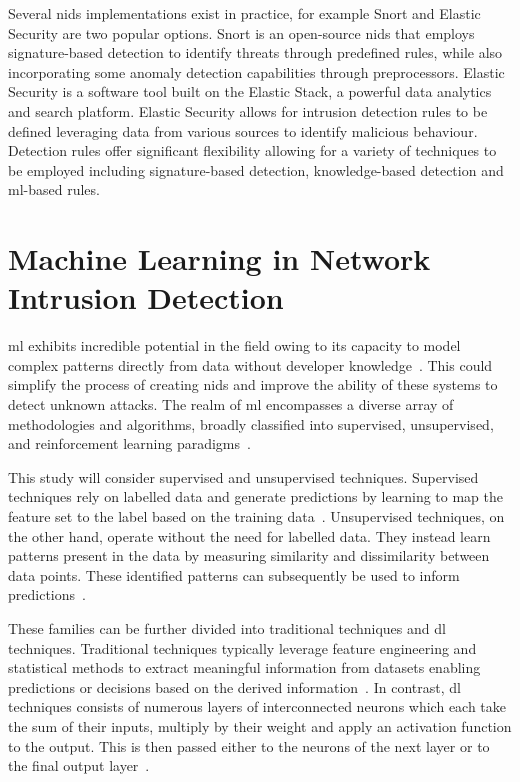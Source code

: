 Several \gls{nids} implementations exist in practice, for example Snort and
Elastic Security are two popular options. Snort is an open-source \gls{nids}
that employs signature-based detection to identify threats through predefined
rules, while also incorporating some anomaly detection capabilities through
preprocessors. Elastic Security is a software tool built on the Elastic Stack,
a powerful data analytics and search platform. Elastic Security allows for
intrusion detection rules to be defined leveraging data from various sources to
identify malicious behaviour. Detection rules offer significant flexibility
allowing for a variety of techniques to be employed including signature-based
detection, knowledge-based detection and \gls{ml}-based rules.

\section{Machine Learning in Network Intrusion
  Detection}%
\label{sec:ml_nids}

\gls{ml} exhibits incredible potential in the field owing to its capacity to
model complex patterns directly from data without developer
knowledge~\cite{ml}.
This could simplify the process of creating \gls{nids} and improve the ability
of these systems to detect unknown attacks. The realm of \gls{ml} encompasses a
diverse array of methodologies and algorithms, broadly classified into
supervised, unsupervised, and reinforcement learning
paradigms~\cite{ml_taxonomy}.

This study will consider supervised and unsupervised techniques. Supervised
techniques rely on labelled data and generate predictions by learning to map
the feature set to the label based on the training data~\cite{supervised_ml,
    ml_taxonomy}. Unsupervised techniques, on the other hand, operate without the
need for labelled data. They instead learn patterns present in the data by
measuring similarity and dissimilarity between data points. These identified
patterns can subsequently be used to inform predictions~\cite{unsupervised_ml,
    ml_taxonomy}.

These families can be further divided into traditional techniques and \gls{dl}
techniques. Traditional techniques typically leverage feature engineering and
statistical methods to extract meaningful information from datasets enabling
predictions or decisions based on the derived information~\cite{Najafabadi2015,
    useful_ml}. In contrast, \gls{dl} techniques consists of numerous layers of
interconnected neurons which each take the sum of their inputs, multiply by
their weight and apply an activation function to the output. This is then
passed either to the neurons of the next layer or to the final output
layer~\cite{dl}.

